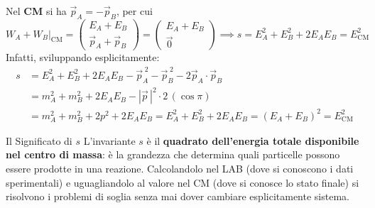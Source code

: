 Nel \textbf{CM} si ha $\vec{p}_A = -\vec{p}_B$, per cui
\begin{equation*}
    W_A + W_B \big|_{\text{CM}} = \begin{pmatrix} E_A + E_B \\ \vec{p}_A + \vec{p}_B \end{pmatrix}
    = \begin{pmatrix} E_A + E_B \\ \vec{0} \end{pmatrix}
    \implies s = E_A^2 + E_B^2 + 2E_A E_B = E_{\text{CM}}^2
\end{equation*}
Infatti, sviluppando esplicitamente:
\begin{align*}
    s &= E_A^2 + E_B^2 + 2E_AE_B - \vec{p}_A^{\;2} - \vec{p}_B^{\;2} - 2\vec{p}_A \cdot \vec{p}_B \\
      &= m_A^2 + m_B^2 + 2E_AE_B - |\vec{p}\,|^2 \cdot 2\,(\cos \pi) \\
      &= m_A^2 + m_B^2 + 2p^2 + 2E_AE_B = E_A^2 + E_B^2 + 2E_AE_B = (E_A + E_B)^2 = E_{\text{CM}}^2
\end{align*}

\begin{osservazione}{Il Significato di $s$}
L'invariante $s$ è il \textbf{quadrato dell'energia totale disponibile nel centro di massa}: è la grandezza che determina quali particelle possono essere prodotte in una reazione. Calcolandolo nel LAB (dove si conoscono i dati sperimentali) e uguagliandolo al valore nel CM (dove si conosce lo stato finale) si risolvono i problemi di soglia senza mai dover cambiare esplicitamente sistema.
\end{osservazione}

